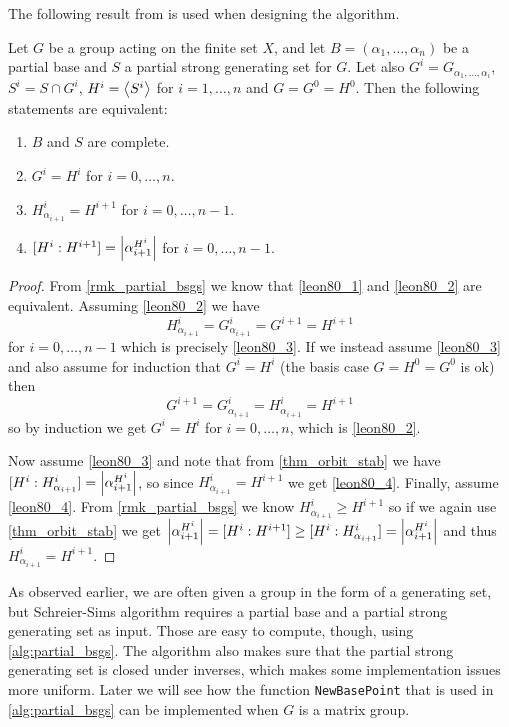  The following result from \cite{leon80} is used when designing the algorithm.
\begin{theorem} \label{thm_leon}
  Let $G$ be a group acting on the finite set $X$, and let $B =
  (\alpha_1, \dotsc, \alpha_n)$ be a partial base and $S$ a partial
  strong generating set for $G$. Let also $G^i = G_{\alpha_1, \dotsc,
    \alpha_i}$, $S^i = S \cap G^i$, $H^i = \left\langle S^i \right\rangle$ for $i = 1,
  \dotsc, n$ and $G = G^0 = H^0$. Then the following statements are equivalent:
\begin{enumerate}
\item $B$ and $S$ are complete. \label{leon80_1}
\item $G^i = H^i$ for $i = 0, \dotsc, n$. \label{leon80_2}
\item $H^i_{\alpha_{i + 1}} = H^{i + 1}$ for $i = 0, \dotsc, n - 1$. \label{leon80_3}
\item $[H^i : H^{i + 1}] = \left\lvert \alpha_{i+1}^{H^i} \right\rvert$ for $i = 0, \dotsc, n - 1$. \label{leon80_4}
\end{enumerate}
\end{theorem}
\begin{proof}
From \ref{rmk_partial_bsgs} we know that \eqref{leon80_1} and \eqref{leon80_2} are equivalent. Assuming \eqref{leon80_2} we have
\begin{equation}
H^i_{\alpha_{i + 1}} = G^i_{\alpha_{i + 1}} = G^{i + 1} = H^{i + 1}
\end{equation}
for $i = 0, \dotsc, n - 1$ which is precisely \eqref{leon80_3}. If we instead assume \eqref{leon80_3} and also assume for induction that $G^i = H^i$ (the basis case $G = H^0 = G^0$ is ok) then
\begin{equation}
G^{i + 1} = G^i_{\alpha_{i + 1}} = H^i_{\alpha_{i + 1}} = H^{i + 1}
\end{equation}
so by induction we get $G^i = H^i$ for $i = 0, \dotsc, n$, which is \eqref{leon80_2}.

Now assume \eqref{leon80_3} and note that from \ref{thm_orbit_stab} we
have $[H^i : H^i_{\alpha_{i + 1}}] = \left\lvert \alpha_{i+1}^{H^i} \right\rvert$, so
since $H^i_{\alpha_{i + 1}} = H^{i + 1}$ we get \eqref{leon80_4}.
Finally, assume \eqref{leon80_4}. From \ref{rmk_partial_bsgs} we know
$H^i_{\alpha_{i + 1}} \geq H^{i + 1}$ so if we again use
\ref{thm_orbit_stab} we get $\left\lvert \alpha_{i+1}^{H^i} \right\rvert = [H^i : H^{i +
  1}] \geq [H^i : H^i_{\alpha_{i + 1}}] = \left\lvert \alpha_{i+1}^{H^i} \right\rvert$
and thus $H^i_{\alpha_{i + 1}} = H^{i + 1}$.
\end{proof}

As observed earlier, we are often given a group in the form of a
generating set, but Schreier-Sims algorithm requires a partial base
and a partial strong generating set as input. Those are easy to
compute, though, using \ref{alg:partial_bsgs}. The algorithm also
makes sure that the partial strong generating set is closed under
inverses, which makes some implementation issues more uniform. Later we will see how the function \texttt{NewBasePoint} that is used in \ref{alg:partial_bsgs} can be implemented when $G$ is a matrix group.

